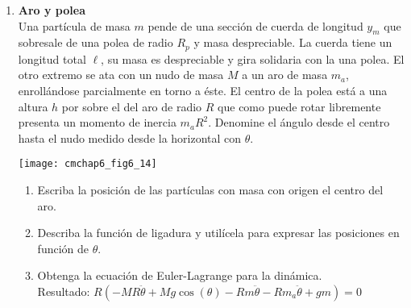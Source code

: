 \documentclass[11pt, spanish, a4paper, twoside]{article}
\begin{document}
\begin{enumerate}
\item 
	\begin{minipage}[t][2.6cm]{0.8\textwidth}
		\textbf{Aro y polea}\\
		Una partícula de masa \(m\) pende de una sección de cuerda de longitud \(y_m\) que sobresale de una polea de radio \(R_p\) y masa despreciable.
		La cuerda tiene un longitud total \(\ell\), su  masa es despreciable y gira solidaria con la una polea.
		El otro extremo se ata con un nudo de masa \(M\) a un aro de masa \(m_a\), enrollándose parcialmente en torno a éste.
		El centro de la polea está a una altura \(h\) por sobre el del aro de radio \(R\) que como puede rotar libremente presenta un momento de inercia \(m_a R^2\).
		Denomine el ángulo desde el centro hasta el nudo medido desde la horizontal con \(\theta\). 
	\end{minipage}
	\begin{minipage}[c][0cm][t]{0.2\textwidth}
		\texttt{[image: cmchap6\_fig6\_14]}
	\end{minipage}
	\begin{enumerate}
		\item Escriba la posición de las partículas con masa con origen el centro del aro.
		\item Describa la función de ligadura y utilícela para expresar las posiciones en función de \(\theta\).
		\item Obtenga la ecuación de Euler-Lagrange para la dinámica.\\
		Resultado:
		$R \left(- M R \ddot{\theta} + M g \cos{\left(\theta \right)} - R m \ddot{\theta} - R m_{a} \ddot{\theta} + g m\right) = 0$
	\end{enumerate}



\end{enumerate}
\end{document}
